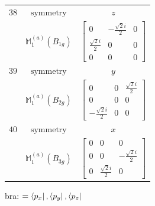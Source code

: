\documentclass[fleqn,8pt,landscape]{jsarticle}
\begin{document}
\begin{longtable}{ccc}
$ 38 $ & $ \text{symmetry} $ & $ z $ \\
$  $ & $ \mathbb{M}_{1}^{(a)}(B_{1g}) $ & $ \begin{bmatrix} 0 & - \frac{\sqrt{2} i}{2} & 0 \\ \frac{\sqrt{2} i}{2} & 0 & 0 \\ 0 & 0 & 0 \end{bmatrix} $ \\ \hline
$ 39 $ & $ \text{symmetry} $ & $ y $ \\
$  $ & $ \mathbb{M}_{1}^{(a)}(B_{2g}) $ & $ \begin{bmatrix} 0 & 0 & \frac{\sqrt{2} i}{2} \\ 0 & 0 & 0 \\ - \frac{\sqrt{2} i}{2} & 0 & 0 \end{bmatrix} $ \\ \hline
$ 40 $ & $ \text{symmetry} $ & $ x $ \\
$  $ & $ \mathbb{M}_{1}^{(a)}(B_{3g}) $ & $ \begin{bmatrix} 0 & 0 & 0 \\ 0 & 0 & - \frac{\sqrt{2} i}{2} \\ 0 & \frac{\sqrt{2} i}{2} & 0 \end{bmatrix} $ \\ \hline
\end{longtable}
bra: $=\bra{p_{x}}, \bra{p_{y}}, \bra{p_{z}}$
\end{document}
